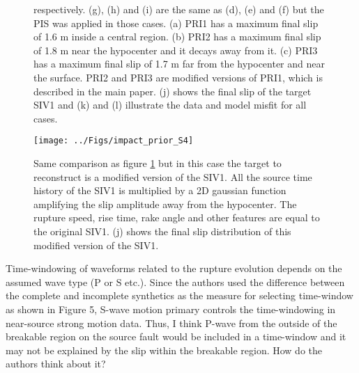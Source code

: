 \documentclass[10pt]{extarticle}
\begin{document}
\begin{Answer}
\begin{figure}[!h]
{    respectively. (g), (h) and (i) are the same as (d), (e) and (f) but the PIS was 
    applied in those cases. (a) PRI1 has a maximum final slip of 1.6 m inside a 
    central region. (b) PRI2 has a maximum final slip of 1.8 m near the hypocenter and 
    it decays away from it. (c) PRI3 has a maximum final slip of 1.7 m far from the 
    hypocenter and near the surface. PRI2 and PRI3 are modified versions of PRI1, which 
    is described in the main paper. (j) shows the final slip of the target SIV1 and 
    (k) and (l) illustrate the data and model misfit for all cases.}
    \label{fig:figure_s2}
\end{figure}
\begin{figure}[!h]
\begin{center}
  \texttt{[image: ../Figs/impact\_prior\_S4]} 
\end{center}
  \caption{Same comparison as figure \ref{fig:figure_s2} but in this case the 
  target to reconstruct is a modified version of the SIV1. All the source 
  time history of the SIV1 is multiplied by a 2D gaussian function amplifying 
  the slip amplitude away from the hypocenter. The rupture speed, rise time,
  rake angle and other features are equal to the original SIV1. (j) shows the final 
  slip distribution of this modified version of the SIV1.}
    \label{fig:figure_s3}
\end{figure}
 \WorkInProgressRevTask
\end{Answer}
%
%
\begin{ReviewerComment}{2}
\noindent
 Time-windowing of waveforms related to the rupture evolution 
 depends on the assumed wave type (P or S etc.). Since the 
 authors used the difference between the complete and incomplete
 synthetics as the measure for selecting time-window as shown 
 in Figure 5, S-wave motion primary controls the time-windowing
 in near-source strong motion data. Thus, I think P-wave from the
 outside of the breakable region on the source fault would be
 included in a time-window and it may not be explained by the
 slip within the breakable region. How do the authors think
 about it?
\end{ReviewerComment}
\end{document}
